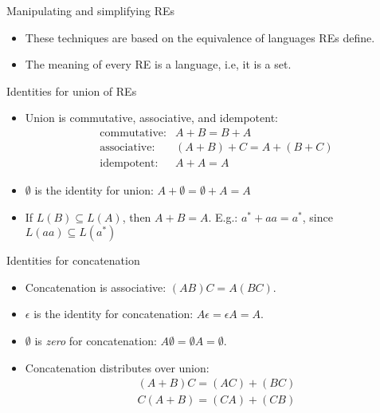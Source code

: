 \documentclass{prosper}%
\begin{document}
\begin{slide}{Manipulating and simplifying REs}
\begin{itemize}
\item These techniques are based on the equivalence of languages  REs define.
\item The meaning of every RE is a language, i.e, {\blue it is a set}. 
\end{itemize}
{\blue Identities for union of REs}
\begin{itemize}
\item Union is commutative, associative, and idempotent: 
\[
\begin{array}{ll}
\mbox{commutative:} & A+B= B+A \\
\mbox{associative:} & (A+B)+C=A+(B+C)\\
\mbox{idempotent:} &  A+A=A
\end{array}
\]
\item $\emptyset$ is the identity for union: $A+\emptyset=\emptyset+A=A$
\item If $L(B)\subseteq L(A)$, then $A+B=A$. E.g.: $a^*+aa=a^*$, since $L(aa)\subseteq L(a^*)$
\end{itemize}
\end{slide}

\begin{slide}{Identities for concatenation}
\begin{itemize}
\item Concatenation is associative: $(AB)C=A(BC)$.
\item $\epsilon$ is the identity for concatenation: $A\epsilon=\epsilon A=A$.
\item $\emptyset$ is {\em zero} for concatenation: $A\emptyset=\emptyset A=\emptyset$.
\item Concatenation distributes over union: 
\[
\begin{array}{l}
(A+B)C=(AC)+(BC)\\
 C(A+B)=(CA)+(CB)
 \end{array}
 \]
\end{itemize}
\end{slide}
\end{document}
